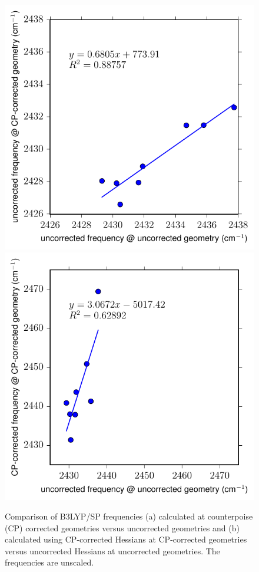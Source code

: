 \begin{figure}
  \centering
  \includegraphics{paper_02/Fig3a.pdf}
  \includegraphics{paper_02/Fig3b.pdf}
  \caption{Comparison of B3LYP/SP frequencies (a) calculated at counterpoise (CP) corrected geometries versus uncorrected geometries and (b) calculated using CP-corrected Hessians at CP-corrected geometries versus uncorrected Hessians at uncorrected geometries. The frequencies are unscaled.}
  \label{paper_02:fig:3}
\end{figure}

